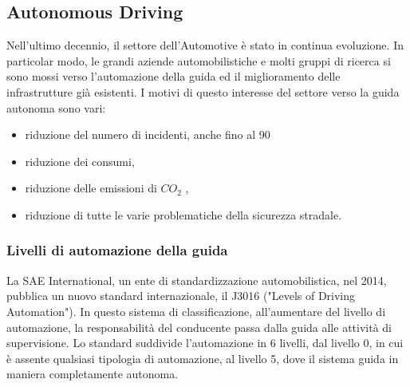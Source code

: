 \documentclass[14pt]{extarticle}
\begin{document}
\subsection{Autonomous Driving}
Nell’ultimo decennio, il settore dell’Automotive è stato in continua evoluzione. In particolar modo, le grandi aziende automobilistiche e molti gruppi di ricerca si sono mossi verso l’automazione della guida ed
il miglioramento delle infrastrutture già esistenti. I motivi di questo
interesse del settore verso la guida autonoma sono vari:
\begin{itemize}
\item riduzione del numero di incidenti, anche fino al 90%
\item  riduzione dei consumi,
\item  riduzione delle emissioni di $CO_{2}$ ,
\item  riduzione di tutte le varie problematiche della sicurezza
stradale.
\end{itemize}

\subsubsection{Livelli di automazione della guida}
La SAE International, un ente di standardizzazione automobilistica,  nel 2014, pubblica un nuovo standard internazionale, il J3016 ("Levels of Driving Automation").
In questo sistema di classificazione, all’aumentare del livello di automazione, la responsabilità del conducente passa dalla guida alle attività di
supervisione.
Lo standard suddivide l'automazione in 6 livelli, dal livello 0, in cui è assente qualsiasi tipologia di automazione, al livello 5, dove il sistema guida in maniera completamente autonoma.
\end{document}
